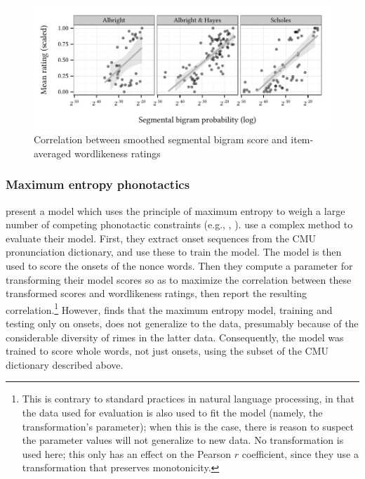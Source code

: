 \begin{figure}[t]
\centering
\includegraphics{bigram.pdf}
\caption{Correlation between smoothed segmental bigram score and item-averaged wordlikeness ratings}
\label{bigram}
\end{figure}

\subsubsection{Maximum entropy phonotactics}

\citet{Hayes2008a} present a model which uses the principle of maximum entropy to weigh a large number of competing phonotactic constraints (e.g., \citealt{Goldwater2003}, \citealt{Jager2007}). 
\citeauthor{Hayes2008a} use a complex method to evaluate their model. First, they extract onset sequences from the CMU pronunciation dictionary, and use these to train the model. The model is then used to score the onsets of the \citet{Scholes1966} nonce words. Then they compute a parameter for transforming their model scores so as to maximize the correlation between these transformed scores and wordlikeness ratings, then report the resulting correlation.\footnote{This is contrary to standard practices in natural language processing, in that the data used for evaluation is also used to fit the model (namely, the transformation's parameter); when this is the case, there is reason to suspect the parameter values will not generalize to new data.
No transformation is used here; this only has an effect on the Pearson $r$ coefficient, since they use a transformation that preserves monotonicity.}
However, \citet{Albright2009a} finds that the maximum entropy model, training and testing only on onsets, does not generalize to the \citet{Albright2003b} data, presumably because of the considerable diversity of rimes in the latter data. 
Consequently, the model was trained to score whole words, not just onsets, using the subset of the CMU dictionary described above. 


